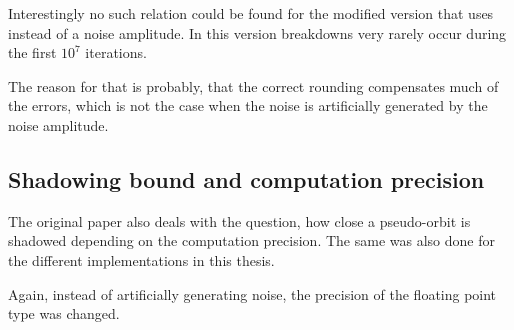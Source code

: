   Interestingly no such relation could be found for the modified version that
  uses  instead of a noise amplitude.
  In this version breakdowns very rarely occur during the first $10^7$
  iterations.

  The reason for that is probably, that the correct rounding compensates much
  of the errors, which is not the case when the noise is artificially generated
  by the noise amplitude.

  \subsection{Shadowing bound and computation precision}
  The original paper also deals with the question, how close a pseudo-orbit is
  shadowed depending on the computation precision. The same was also done for
  the different implementations in this thesis.

  Again, instead of artificially generating noise, the precision of the
  floating point type was changed.

